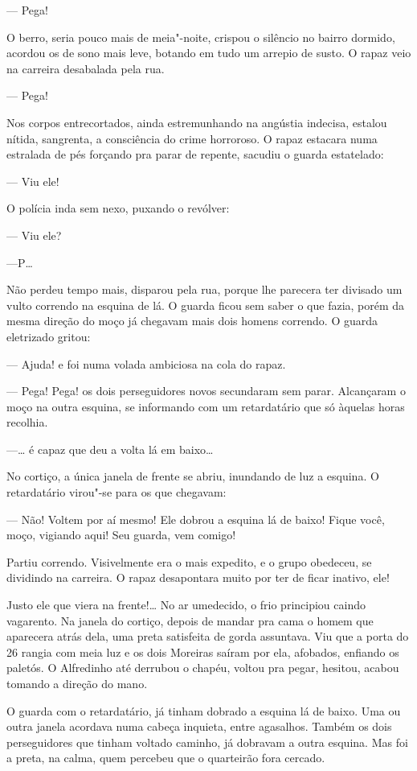 \begin{linenumbers}
--- Pega!

O berro, seria pouco mais de meia"-noite, crispou o silêncio no bairro
dormido, acordou os de sono mais leve, botando em tudo um arrepio de
susto. O rapaz veio na carreira desabalada pela rua.

--- Pega!

Nos corpos entrecortados, ainda estremunhando na angústia indecisa,
estalou nítida, sangrenta, a consciência do crime horroroso. O rapaz
estacara numa estralada de pés forçando pra parar de repente, sacudiu o
guarda estatelado:

--- Viu ele!

O polícia inda sem nexo, puxando o revólver:

--- Viu ele?

---P\ldots{}

Não perdeu tempo mais, disparou pela rua, porque lhe parecera ter
divisado um vulto correndo na esquina de lá. O guarda ficou sem saber o
que fazia, porém da mesma direção do moço já chegavam mais dois homens
correndo. O guarda eletrizado gritou:

--- Ajuda! e foi numa volada ambiciosa na cola do rapaz.

--- Pega! Pega! os dois perseguidores novos secundaram sem parar.
Alcançaram o moço na outra esquina, se informando com um retardatário
que só àquelas horas recolhia.

---\ldots{} é capaz que deu a volta lá em baixo\ldots{}

No cortiço, a única janela de frente se abriu, inundando de luz a
esquina. O retardatário virou"-se para os que chegavam:

--- Não! Voltem por aí mesmo! Ele dobrou a esquina lá de baixo! Fique
você, moço, vigiando aqui! Seu guarda, vem comigo!

Partiu correndo. Visivelmente era o mais expedito, e o grupo obedeceu,
se dividindo na carreira. O rapaz desapontara muito por ter de ficar
inativo, ele!

Justo ele que viera na frente!\ldots{} No ar umedecido, o frio principiou
caindo vagarento. Na janela do cortiço, depois de mandar pra cama o
homem que aparecera atrás dela, uma preta satisfeita de gorda assuntava.
Viu que a porta do 26 rangia com meia luz e os dois Moreiras saíram por
ela, afobados, enfiando os paletós. O Alfredinho até derrubou o chapéu,
voltou pra pegar, hesitou, acabou tomando a direção do mano.

O guarda com o retardatário, já tinham dobrado a esquina lá de baixo.
Uma ou outra janela acordava numa cabeça inquieta, entre agasalhos.
Também os dois perseguidores que tinham voltado caminho, já dobravam a
outra esquina. Mas foi a preta, na calma, quem percebeu que o quarteirão
fora cercado.


\end{linenumbers}
